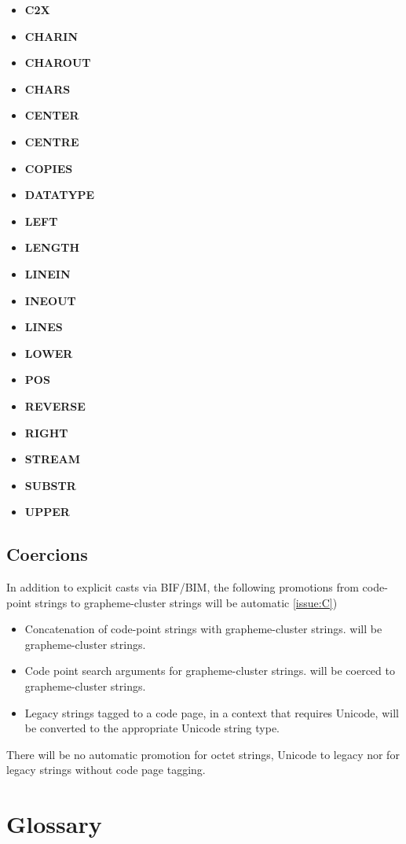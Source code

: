\documentclass[b4paper]{article}
\begin{document}
\begin{itemize}
\item \textbf{C2X}
\item \textbf{CHARIN}
\item \textbf{CHAROUT}
\item \textbf{CHARS}
\item \textbf{CENTER}
\item \textbf{CENTRE}
\item \textbf{COPIES}
\item \textbf{DATATYPE}
\item \textbf{LEFT}
\item \textbf{LENGTH}
\item \textbf{LINEIN}
\item \textbf{INEOUT}
\item \textbf{LINES}
\item \textbf{LOWER}
\item \textbf{POS}
\item \textbf{REVERSE}
\item \textbf{RIGHT}
\item \textbf{STREAM}
\item \textbf{SUBSTR}
\item \textbf{UPPER}
\end{itemize}

\subsection{Coercions}
In addition to explicit casts via BIF/BIM, the following promotions
from code-point strings to grapheme-cluster strings will be automatic
\cref{issue:C})

\begin{itemize}
\item Concatenation of code-point strings with grapheme-cluster strings.
will be grapheme-cluster strings.
\item Code point search arguments for grapheme-cluster strings.
will be coerced to grapheme-cluster strings.
\item Legacy strings tagged to a code page, in a context that requires Unicode,
will be converted to the appropriate Unicode string type.
\end{itemize}

There will be no automatic promotion for octet strings, Unicode to
legacy nor for legacy strings without code page tagging.


\section{Glossary}
\end{document}
